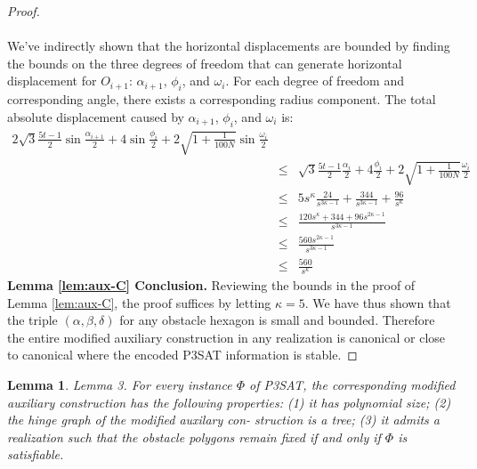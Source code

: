 \documentclass[10pt]{CSUNthesis}
\theoremstyle{plain}%
\newtheorem{lem}{Lemma}
\theoremstyle{definition}
\theoremstyle{remark}
\begin{document}
\begin{proof}
\paragraph{}  We've indirectly shown that the horizontal displacements are bounded by finding the bounds on the three degrees of freedom that can generate horizontal displacement for $O_{i+1}$: $\alpha_{i+1}$, $\phi_i$, and $\omega_i$.  
For each degree of freedom and corresponding angle, there exists a corresponding radius component.  
The total absolute displacement caused by $\alpha_{i+1}$, $\phi_i$, and $\omega_i$ is:
\begin{eqnarray*}
2\sqrt{3} \frac{5t-1}{2} \sin \frac{\alpha_{i+1}}{2} + 4 \sin \frac{\phi_i}{2} + 2 \sqrt{1 + \frac{1}{100N}} \sin \frac{\omega_i}{2}  \\
&\leq& \sqrt{3} \frac{5t-1}{2} \frac{\alpha_i}{2} + 4 \frac{\phi_i}{2} + 2 \sqrt{1 + \frac{1}{100N}} \frac{\omega_i}{2}  \\  
&\leq&  5s^\kappa \frac{24}{s^{3\kappa-1}} +  \frac{344}{s^{3\kappa - 1}} +  \frac{96}{s^\kappa}\\
&\leq& \frac{120s^\kappa + 344 + 96 s^{2\kappa - 1} }{s^{3\kappa - 1}} \\
&\leq& \frac{560 s^{2\kappa - 1} }{s^{3\kappa - 1}}\\
&\leq& \frac{560  }{s^\kappa }
\end{eqnarray*}\textbf{Lemma \ref{lem:aux-C} Conclusion.} 
Reviewing the bounds in the proof of Lemma \ref{lem:aux-C}, the proof suffices by letting $\kappa = 5$.  
We have thus shown that the triple $(\alpha, \beta, \delta)$ for any obstacle hexagon is small and bounded.  
Therefore the entire modified auxiliary construction in any realization is canonical or close to canonical where the encoded P3SAT information is stable.
\end{proof}\begin{lem}\label{lem:lePieceDuResistance}
Lemma 3. For every instance $\Phi$ of P3SAT, the corresponding modified auxiliary construction
has the following properties: (1) it has polynomial size; (2) the hinge graph of the modified auxilary con-
struction is a tree; (3) it admits a realization such that the obstacle polygons remain fixed if and only if $\Phi$ is
satisfiable.
\end{lem}
\end{document}
